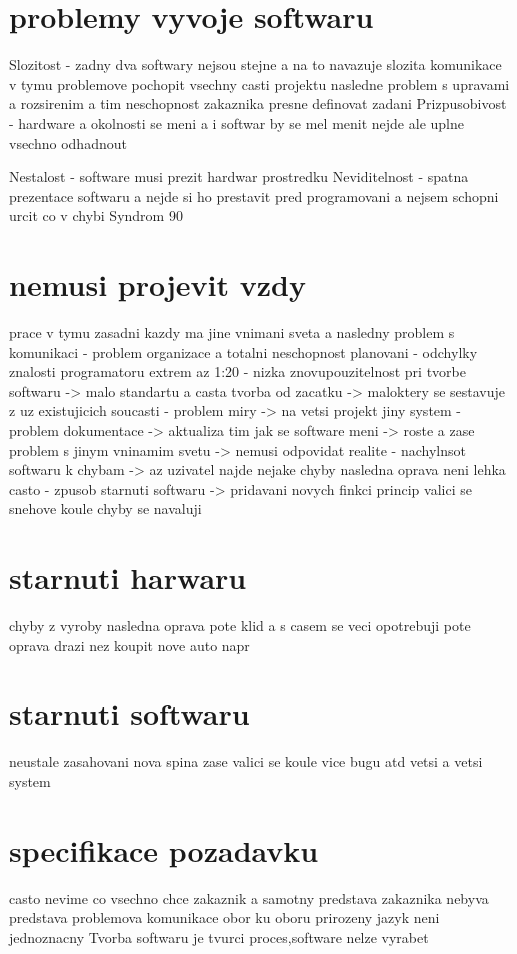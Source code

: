 \documentclass{article}
\begin{document}
\section{problemy vyvoje softwaru}
Slozitost - zadny dva softwary nejsou stejne a na to navazuje slozita komunikace v tymu
            problemove pochopit vsechny casti projektu
            nasledne problem s  upravami a rozsirenim
            a tim neschopnost zakaznika presne definovat zadani
Prizpusobivost - hardware a okolnosti se meni a i softwar by se mel menit nejde ale uplne vsechno odhadnout

Nestalost - software musi prezit hardwar prostredku
Neviditelnost - spatna prezentace softwaru a nejde si ho prestavit pred programovani
                a nejsem schopni urcit co v chybi
Syndrom 90%
\section{nemusi projevit vzdy}
prace v tymu zasadni kazdy ma jine vnimani sveta a nasledny problem s komunikaci
- problem organizace a totalni neschopnost planovani
- odchylky znalosti programatoru extrem az 1:20
- nizka znovupouzitelnost pri tvorbe softwaru
        -> malo standartu a casta tvorba od zacatku
        -> maloktery se sestavuje z uz existujicich soucasti
- problem miry
        -> na vetsi projekt jiny system
- problem dokumentace
        -> aktualiza tim jak se software meni
        -> roste a zase problem s jinym vninamim svetu
        -> nemusi odpovidat realite
- nachylnsot softwaru k chybam
-> az uzivatel najde nejake chyby nasledna oprava neni lehka casto
- zpusob starnuti softwaru
-> pridavani novych finkci princip valici se snehove koule chyby se navaluji
\section{starnuti harwaru}
chyby z vyroby nasledna oprava pote klid a s casem se veci opotrebuji pote oprava drazi nez koupit nove auto napr
\section{starnuti softwaru}
neustale zasahovani nova spina zase valici se koule vice bugu atd vetsi a vetsi system
\section{specifikace pozadavku}
casto nevime co vsechno chce zakaznik a samotny predstava zakaznika nebyva predstava
problemova komunikace obor ku oboru
prirozeny jazyk neni jednoznacny
Tvorba softwaru je tvurci proces,software nelze vyrabet
\end{document}
